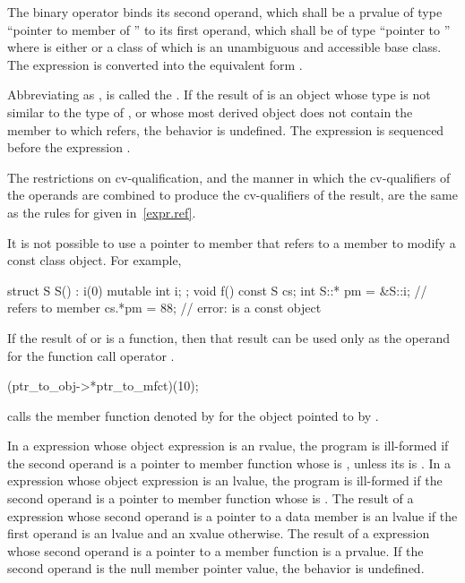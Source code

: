 \pnum
The binary operator \tcode{->*} binds its second operand, which shall be
a prvalue
of type ``pointer to member of '' to its first operand, which shall be of
type ``pointer to ''
where  is either  or
a class of which 
is an unambiguous and accessible base class.
The expression  is converted into the equivalent form
.

\pnum
Abbreviating  as , 
is called the .
If the result of  is an object
whose type is not similar to the type of , or
whose most derived object does not
contain the member to which
 refers, the behavior is undefined.
The expression  is sequenced before the expression .

\pnum
The restrictions on cv-qualification, and the manner in which
the cv-qualifiers of the operands are combined to produce the
cv-qualifiers of the result, are the same as the rules for
 given in~\ref{expr.ref}.
\begin{note}
It is not possible to use a pointer to member that refers to a
 member to modify a const class object. For
example,
\begin{codeblock}
struct S {
  S() : i(0) { }
  mutable int i;
};
void f()
{
  const S cs;
  int S::* pm = &S::i;          //  refers to  member 
  cs.*pm = 88;                  // error:  is a const object
}
\end{codeblock}
\end{note}

\pnum
{}%
If the result of  or \tcode{->*} is a function, then that
result can be used only as the operand for the function call operator
\tcode{()}.
\begin{example}
\begin{codeblock}
(ptr_to_obj->*ptr_to_mfct)(10);
\end{codeblock}
calls the member function denoted by  for the object
pointed to by .
\end{example}
In a  expression whose object expression is an rvalue, the program is
ill-formed if the second operand is a pointer to member function
whose  is \tcode{\&},
unless its  is .
In a 
expression whose object expression is an lvalue, the program is ill-formed if the second
operand is
a pointer to member function
whose  is \tcode{\&\&}.
The result of a  expression
whose second operand is a pointer to a data member is an lvalue if the first
operand is an lvalue and an xvalue otherwise. The result of a  expression whose
second operand is a pointer to a member function is a prvalue.
If the second operand is the null
member pointer value, the behavior is undefined.

